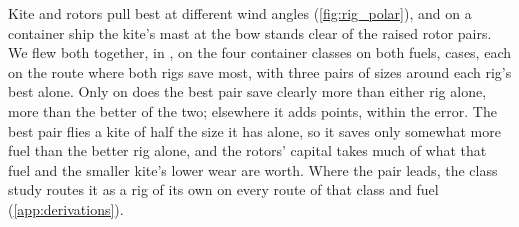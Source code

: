 Kite and rotors pull best at different wind angles (\cref{fig:rig_polar}), and on a container ship the kite's mast at the bow stands clear of the raised rotor pairs. We flew both together, in \NumCombinationRun{}, on the four container classes on both fuels, \NumCombinationCases{} cases, each on the route where both rigs save most, with three pairs of sizes around each rig's best alone. Only on \NumCombinationLeading{} does the best pair save clearly more than either rig alone, \NumCombinationBestGain{} more than the better of the two; elsewhere it adds \NumCombinationOtherGains{} points, within the error. The best pair flies a kite of half the size it has alone, so it saves only somewhat more fuel than the better rig alone, and the rotors' capital takes much of what that fuel and the smaller kite's lower wear are worth. Where the pair leads, the class study routes it as a rig of its own on every route of that class and fuel (\cref{app:derivations}). 
